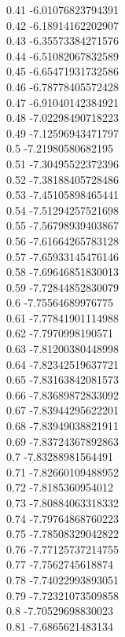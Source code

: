 {0.41	-6.01076823794391\\
0.42	-6.18914162202907\\
0.43	-6.35573384271576\\
0.44	-6.51082067832589\\
0.45	-6.65471931732586\\
0.46	-6.78778405572428\\
0.47	-6.91040142384921\\
0.48	-7.02298490718223\\
0.49	-7.12596943471797\\
0.5	-7.21980580682195\\
0.51	-7.30495522372396\\
0.52	-7.38188405728486\\
0.53	-7.45105898465441\\
0.54	-7.51294257521698\\
0.55	-7.56798939403867\\
0.56	-7.61664265783128\\
0.57	-7.65933145476146\\
0.58	-7.69646851830013\\
0.59	-7.72844852830079\\
0.6	-7.75564689976775\\
0.61	-7.77841901114988\\
0.62	-7.7970998190571\\
0.63	-7.81200380448998\\
0.64	-7.82342519637721\\
0.65	-7.83163842081573\\
0.66	-7.83689872833092\\
0.67	-7.83944295622201\\
0.68	-7.83949038821911\\
0.69	-7.83724367892863\\
0.7	-7.83288981564491\\
0.71	-7.82660109488952\\
0.72	-7.8185360954012\\
0.73	-7.80884063318332\\
0.74	-7.79764868760223\\
0.75	-7.78508329042822\\
0.76	-7.77125737214755\\
0.77	-7.7562745618874\\
0.78	-7.74022993893051\\
0.79	-7.72321073509858\\
0.8	-7.70529698830023\\
0.81	-7.6865621483134\\
}
